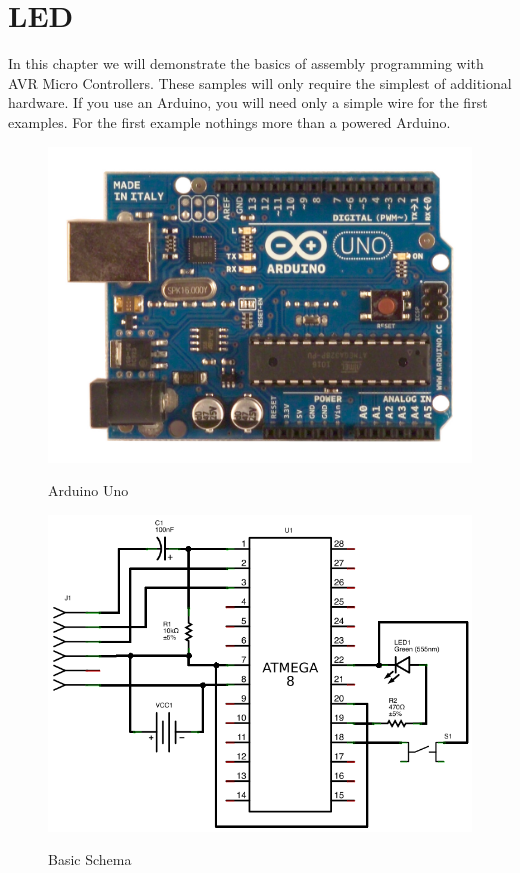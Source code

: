 \documentclass[twoside,english,12pt,authoryear,openright]{book}
\begin{document}
\chapter{LED}

In this chapter we will demonstrate the basics of assembly programming with AVR Micro Controllers. These samples will only require the simplest of additional hardware. If you use an Arduino, you will need only a simple wire for the first examples. For the first example nothings more than a powered Arduino.

\begin{figure}[htbp]
  \centering
  \fbox
   {
     \includegraphics[width=120mm]{Media/www-arduino-cc_ArduinoUnoFront.jpeg}
   }
  \caption{Arduino Uno}
  \label{ArduinoUnoFront}
\end{figure}



\begin{figure}[htbp]
  \centering
  \fbox
   {
     \includegraphics[width=120mm]{LED/S000_LED-Basic-Circuit_schema.png}
   }
  \caption{Basic Schema}
  \label{atmega8-basic-schema}
\end{figure}
\end{document}
